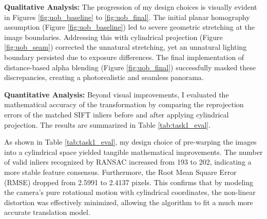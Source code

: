 \documentclass{Resources/UoBLab1}
\begin{document}
    \textbf{Qualitative Analysis:} The progression of my design choices is visually
    evident in Figures \ref{fig:uob_baseline} to \ref{fig:uob_final}. The
    initial planar homography assumption (Figure \ref{fig:uob_baseline}) led to
    severe geometric stretching at the image boundaries. Addressing this with cylindrical
    projection (Figure \ref{fig:uob_seam}) corrected the unnatural stretching,
    yet an unnatural lighting boundary persisted due to exposure differences. The
    final implementation of distance-based alpha blending (Figure
    \ref{fig:uob_final}) successfully masked these discrepancies, creating a
    photorealistic and seamless panorama.

    \textbf{Quantitative Analysis:} Beyond visual improvements, I evaluated the
    mathematical accuracy of the transformation by comparing the reprojection
    errors of the matched SIFT inliers before and after applying cylindrical
    projection. The results are summarized in Table \ref{tab:task1_eval}.

    \begin{table}[htbp]
        \centering
        \caption{Quantitative Comparison: Baseline vs. Cylindrical Projection (Task
        1)}
        \label{tab:task1_eval} 
    \end{table}

    As shown in Table \ref{tab:task1_eval}, my design choice of pre-warping the images
    into a cylindrical space yielded tangible mathematical improvements. The
    number of valid inliers recognized by RANSAC increased from 193 to 202, indicating
    a more stable feature consensus. Furthermore, the Root Mean Square Error (RMSE)
    dropped from 2.5991 to 2.4137 pixels. This confirms that by modeling the
    camera's pure rotational motion with cylindrical coordinates, the non-linear
    distortion was effectively minimized, allowing the algorithm to fit a much
    more accurate translation model.
\end{document}
